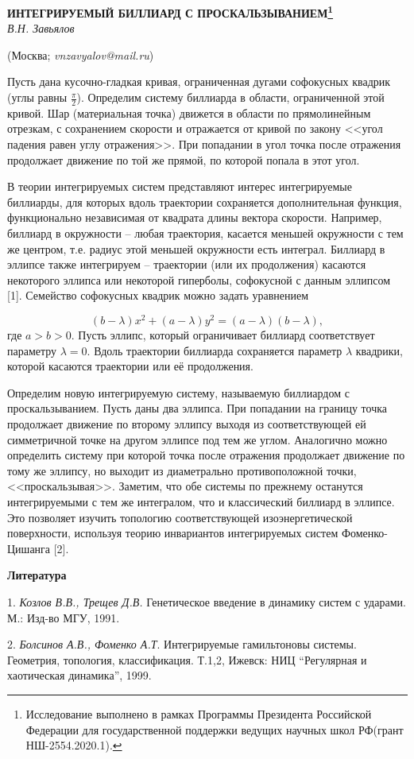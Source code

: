 
\begin{center}
    {\bf ИНТЕГРИРУЕМЫЙ БИЛЛИАРД С ПРОСКАЛЬЗЫВАНИЕМ\footnote{Исследование выполнено в рамках Программы Президента Российской Федерации для государственной поддержки ведущих научных школ РФ(грант НШ-2554.2020.1).}}\\

    {\it В.Н. Завьялов}

    (Москва; {\it vnzavyalov@mail.ru})
\end{center}


Пусть дана кусочно-гладкая кривая, ограниченная дугами софокусных квадрик  (углы равны $\frac{\pi}{2}$). Определим систему биллиарда в области, ограниченной этой кривой. Шар (материальная точка) движется в области по прямолинейным отрезкам, с сохранением скорости и отражается от кривой по закону <<угол падения равен углу отражения>>. При попадании в угол точка после отражения продолжает движение по той же прямой, по которой попала в этот угол.

В теории интегрируемых систем представляют интерес интегрируемые биллиарды, для которых вдоль траектории сохраняется дополнительная функция, функционально независимая от квадрата длины вектора скорости. Например, биллиард в окружности – любая траектория, касается меньшей окружности с тем же центром, т.е. радиус этой меньшей окружности есть интеграл. Биллиард в эллипсе также интегрируем – траектории (или их продолжения) касаются некоторого эллипса или некоторой гиперболы, софокусной с данным эллипсом [1].
Семейство софокусных квадрик можно задать уравнением

$$(b-\lambda)x^2+(a-\lambda)y^2=(a-\lambda)(b-\lambda),$$
где $a>b>0.$  Пусть эллипс, который ограничивает биллиард соответствует параметру $\lambda=0.$ Вдоль траектории биллиарда сохраняется параметр $\lambda$ квадрики, которой касаются траектории или её продолжения.

Определим новую интегрируемую систему, называемую биллиардом с проскальзыванием. Пусть даны два эллипса. При попадании на границу точка продолжает движение по второму эллипсу выходя из соответствующей ей симметричной точке на другом эллипсе под тем же углом. Аналогично можно определить систему при которой точка после отражения продолжает движение по тому же эллипсу, но выходит из диаметрально противоположной точки, <<проскальзывая>>. Заметим, что обе системы по прежнему останутся интегрируемыми с тем же интегралом, что и классический биллиард в эллипсе. Это позволяет изучить топологию соответствующей изоэнергетической поверхности, используя теорию инвариантов интегрируемых систем Фоменко-Цишанга [2].



\smallskip \centerline {\bf Литература} \nopagebreak

1. {\it Козлов В.В., Трещев Д.В.} Генетическое введение в динамику систем с ударами. М.: Изд-во МГУ,  1991.

2. {\it Болсинов А.В., Фоменко А.Т}. Интегрируемые гамильтоновы системы. Геометрия, топология, классификация. Т.1,2, Ижевск: НИЦ “Регулярная и хаотическая динамика”,  1999.


